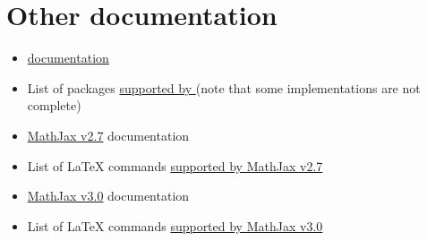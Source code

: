 \documentclass[a4paper]{article}
\theoremstyle{definition}
\begin{document}
\section{Other documentation}
\begin{itemize}
  \item \href{https://dlmf.nist.gov/LaTeXML/docs.html}{\LaTeXML{} documentation}
  \item List of packages \href{https://dlmf.nist.gov/LaTeXML/manual/included.bindings/}{supported by \LaTeXML{}} (note that some implementations are not complete)
  \item \href{http://docs.mathjax.org/en/v2.7-latest/}{MathJax v2.7} documentation
  \item List of \LaTeX{} commands \href{http://docs.mathjax.org/en/v2.7-latest/tex.html#supported-latex-commands}{supported by MathJax v2.7}
  \item \href{http://docs.mathjax.org/en/v3.0-latest/}{MathJax v3.0} documentation
  \item List of \LaTeX{} commands \href{http://docs.mathjax.org/en/v3.0-latest/input/tex/macros/index.html}{supported by MathJax v3.0}
\end{itemize}
\end{document}
